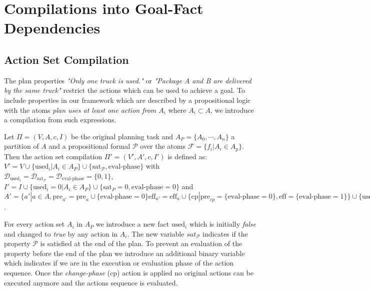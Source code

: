 \section{Compilations into Goal-Fact Dependencies}



\subsection{Action Set Compilation}

The plan properties \textit{"Only one truck is used."} or \textit{"Package A and 
B are delivered by the same truck"} restrict the actions which can be used to 
achieve a goal. To include properties in our framework which are described by a
propositional logic with the atoms \emph{plan uses at least one action from $A_i$} 
where $A_i \subset A$, we introduce a compilation from such expressions.

\begin{definition}
	Let $\Pi = (V, A, c, I)$ be the original planning task and $A_P=\{A_0, \cdots, A_n\}$ 
	a partition of $A$ and a propositional formal $\mathcal{P}$ over the atoms $\mathcal{F} = \{f_i | A_i \in A_p\}$. 
	Then the action set compilation $\Pi' = (V', A', c, I')$ is defined as: 
	$V' = V \cup \{\text{used}_i | A_i \in A_P\} \cup \{\text{sat}_{\mathcal{P}}, \text{eval-phase}\}$ 
	with $\mathcal{D}_{\text{used}_i} = \mathcal{D}_{\text{sat}_{\mathcal{P}}} = \mathcal{D}_{\text{eval-phase}} = \{0,1\}$, 
	$I' = I \cup \{\text{used}_i = 0 | A_i \in A_P\} \cup \{\text{sat}_{P} = 0, \text{eval-phase} = 0\}$ 
	and $A' = \{ a' | a \in A, 
	\text{pre}_{a'} = \text{pre}_{a} \cup \{\text{eval-phase} = 0\} \text{eff}_{a'} = \text{eff}_a \cup 
	\{\text{cp} | \text{pre}_{cp} = \{\text{eval-phase} = 0\}, \text{eff} = \{\text{eval-phase} = 1 \}\} \cup 	
	\{\text{used}_i = 1 | a \in A_i \in A_P\} \cup  
	\{\text{actions to eval } \mathcal{P}\}$. 
\end{definition}


For every action set $A_i$ in $A_P$ we introduce a new fact $\text{used}_i$ which is initially 
\emph{false} and changed to \emph{true} by any action in $A_i$. The new variable $sat_{\mathcal{P}}$ indicates 
if the property $\mathcal{P}$ is satisfied at the end of the plan. To prevent an 
evaluation of the property before the end of the plan we introduce an additional binary variable
which indicates if we are in the execution or evaluation phase of the action sequence. Once the \textit{change-phase} (cp) action
is applied no original actions can be executed anymore and the actions sequence is evaluated.

